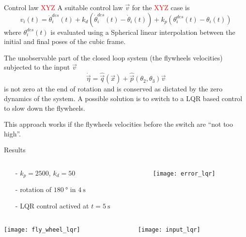 \begin{frame}{Control law \hfill \textcolor{red}{XYZ}}
  A suitable control law $\vec{v}$ for the \textcolor{red}{XYZ} case is
  {\small
    \[
    v_i(t) = \ddot{\theta}_i^{des}(t) + k_d(\dot{\theta}_i^{des}(t) - \dot{\theta}_i(t)) + k_p (\theta_i^{des}(t) - \theta_i(t))
    \]
  }where $\theta_i^{des}(t)$ is evaluated using a Spherical linear interpolation between the initial and final poses of the cubic frame.
  \par
  The unobservable part of the closed loop system (the flywheels velocities) subjected to the input $\vec{v}$
  \[
  \dot{\vec{\eta}} =
  \hat{\vec{q}}(\vec{x}) + \hat{\vec{p}}(\theta_{2},\theta_{3})\vec{v}
  \]
  is \alert{not zero} at the end of rotation and is conserved
  as dictated by the zero dynamics of the system.
  A possible solution is to switch to a \alert{LQR} based control to slow down the flywheels.
  \par
  This approach works if the flywheels velocities before the switch are ``not too high''.
\end{frame}

\begin{frame}{Results \hfill \color{red}{XYZ}}
  \vskip0.1in
  \begin{columns}
    \begin{column}{0.45\textwidth}
      \begin{itemize}
      \item[-]$k_p = 2500$, $k_d = 50$
      \item[-]rotation of $\SI{180}{\degree}$ in $\SI{4}{\second}$
      \item[-]\alert{LQR control actived at $t = \SI{5}{\second}$}
      \end{itemize}
    \end{column}
    \begin{column}{0.45\textwidth}
      \texttt{[image: error\_lqr]}
    \end{column}
  \end{columns}
  \begin{columns}
    \begin{column}{0.45\textwidth}
      \texttt{[image: fly\_wheel\_lqr]}
    \end{column}
    \begin{column}{0.45\textwidth}
      \texttt{[image: input\_lqr]}
    \end{column}
  \end{columns}
\end{frame}

